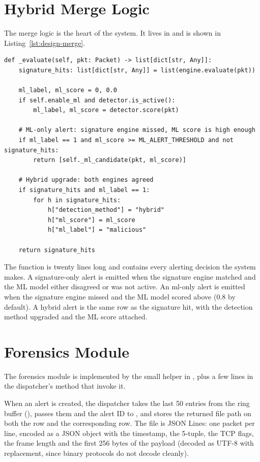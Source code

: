 \section{Hybrid Merge Logic}
\label{sec:design-detection}

The merge logic is the heart of the system. It lives in
 and is shown in
Listing~\ref{lst:design-merge}.

\begin{lstlisting}[style=pyfile,caption={Hybrid alert merge logic},label={lst:design-merge}]
def _evaluate(self, pkt: Packet) -> list[dict[str, Any]]:
    signature_hits: list[dict[str, Any]] = list(engine.evaluate(pkt))

    ml_label, ml_score = 0, 0.0
    if self.enable_ml and detector.is_active():
        ml_label, ml_score = detector.score(pkt)

    # ML-only alert: signature engine missed, ML score is high enough
    if ml_label == 1 and ml_score >= ML_ALERT_THRESHOLD and not signature_hits:
        return [self._ml_candidate(pkt, ml_score)]

    # Hybrid upgrade: both engines agreed
    if signature_hits and ml_label == 1:
        for h in signature_hits:
            h["detection_method"] = "hybrid"
            h["ml_score"] = ml_score
            h["ml_label"] = "malicious"

    return signature_hits
\end{lstlisting}

The function is twenty lines long and contains every alerting
decision the system makes. A signature-only alert is emitted when
the signature engine matched and the ML model either disagreed or
was not active. An ml-only alert is emitted when the signature
engine missed and the ML model scored above
 (0.8 by default). A hybrid alert is
the same row as the signature hit, with the detection method
upgraded and the ML score attached.

\section{Forensics Module}
\label{sec:design-forensics}

The forensics module is implemented by the small helper
 in
, plus a few lines in the
dispatcher's  method that invoke
it.

When an alert is created, the dispatcher takes the last 50 entries
from the ring buffer
(), passes them and the
alert ID to , and stores the returned
file path on both the  row and the corresponding
 row. The file is JSON Lines: one packet per
line, encoded as a JSON object with the timestamp, the 5-tuple,
the TCP flags, the frame length and the first 256 bytes of the
payload (decoded as UTF-8 with replacement, since binary protocols
do not decode cleanly).

